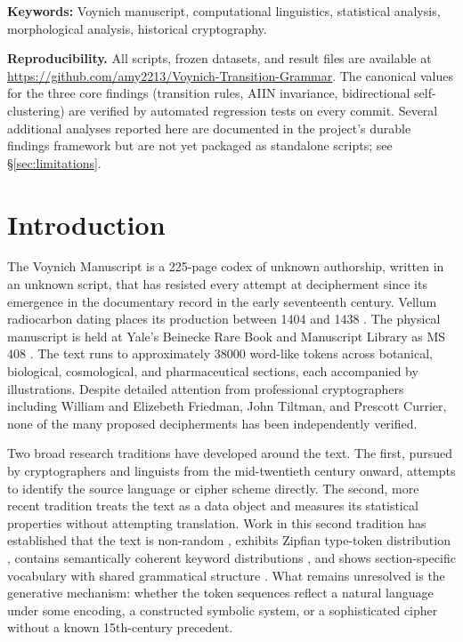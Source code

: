 \documentclass[11pt]{article}
\begin{document}
\bigskip
\noindent\textbf{Keywords:} Voynich manuscript, computational linguistics,
statistical analysis, morphological analysis, historical cryptography.

\bigskip
\noindent\textbf{Reproducibility.} All scripts, frozen datasets, and
result files are available at
\url{https://github.com/amy2213/Voynich-Transition-Grammar}. The
canonical values for the three core findings (transition rules, AIIN
invariance, bidirectional self-clustering) are verified by automated
regression tests on every commit. Several additional analyses reported
here are documented in the project's durable findings framework but are
not yet packaged as standalone scripts; see \S\ref{sec:limitations}.

\section{Introduction}
\label{sec:intro}

The Voynich Manuscript is a 225-page codex of unknown authorship,
written in an unknown script, that has resisted every attempt at
decipherment since its emergence in the documentary record in the early
seventeenth century. Vellum radiocarbon dating places its production
between 1404 and 1438 \citep{Hodgins2011}. The physical manuscript is
held at Yale's Beinecke Rare Book and Manuscript Library as MS 408
\citep{Clemens2016}. The text runs to approximately $\num{38000}$
word-like tokens across botanical, biological, cosmological, and
pharmaceutical sections, each accompanied by illustrations. Despite
detailed attention from professional cryptographers including
William and Elizebeth Friedman, John Tiltman, and Prescott Currier,
none of the many proposed decipherments has been independently verified.

Two broad research traditions have developed around the text. The first,
pursued by cryptographers and linguists from the mid-twentieth century
onward, attempts to identify the source language or cipher scheme
directly. The second, more recent tradition treats the text as a data
object and measures its statistical properties without attempting
translation. Work in this second tradition has established that the
text is non-random \citep{Reddy2011}, exhibits Zipfian type-token
distribution \citep{Bowern2021}, contains semantically coherent
keyword distributions \citep{Montemurro2013}, and shows section-specific
vocabulary with shared grammatical structure \citep{Bowern2021}. What
remains unresolved is the generative mechanism: whether the
token sequences reflect a natural language under some encoding, a
constructed symbolic system, or a sophisticated cipher without a known
15th-century precedent.
\end{document}
